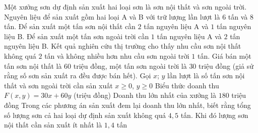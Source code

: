 \begin{ex}%
	Một xưởng sơn dự định sản xuất hai loại sơn là sơn nội thất và sơn ngoài trời. Nguyên liệu để sản xuất gồm hai loại A và B với trữ lượng lần lượt là $6$ tấn và $8$ tấn. Để sản xuất một tấn sơn nội thất cần $2$ tấn nguyên liệu A và $1$ tấn nguyên liệu B. Để sản xuất một tấn sơn ngoài trời cần $1$ tấn nguyên liệu A và $2$ tấn nguyên liệu B. Kết quả nghiên cứu thị trường cho thấy nhu cầu sơn nội thất không quá $2$ tấn và không nhiều hơn nhu cầu sơn ngoài trời $1$ tấn. Giá bán một tấn sơn nội thất là $60$ triệu đồng, một tấn sơn ngoài trời là $30$ triệu đồng (giả sử rằng số sơn sản xuất ra đều được bán hết).
	\choiceTF
	{Gọi $x$; $y$ lần lượt là số tấn sơn nội thất và sơn ngoài trời cần sản xuất $x \ge 0$, $y \ge 0$}
	{Biểu thức doanh thu $F(x, y) = 30x + 60y$ (triệu đồng)}
	{\True Doanh thu lớn nhất của xưởng là $180$ triệu đồng}
	{Trong các phương án sản xuất đem lại doanh thu lớn nhất, biết rằng tổng số lượng sơn cả hai loại dự định sản xuất không quá $4{,}5$ tấn. Khi đó lượng sơn nội thất cần sản xuất ít nhất là $1{,}4$ tấn}
	

\end{ex}
